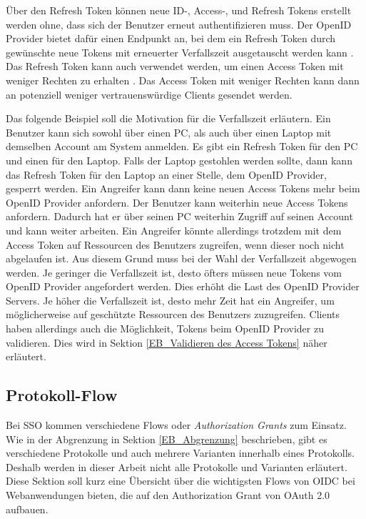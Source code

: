 Über den Refresh Token können neue ID-, Access-, und Refresh Tokens erstellt werden ohne, dass sich der Benutzer erneut authentifizieren muss. Der OpenID Provider bietet dafür einen Endpunkt an, bei dem ein Refresh Token durch gewünschte neue Tokens mit erneuerter Verfallszeit ausgetauscht werden kann \cite[Sec. 1.5]{SSEB_RFC6749}. Das Refresh Token kann auch verwendet werden, um einen Access Token mit weniger Rechten zu erhalten \cite{EB12}. Das Access Token mit weniger Rechten kann dann an potenziell weniger vertrauenswürdige Clients gesendet werden.

Das folgende Beispiel soll die Motivation für die Verfallszeit erläutern. Ein Benutzer kann sich sowohl über einen PC, als auch über einen Laptop mit demselben Account am System anmelden. Es gibt ein Refresh Token für den PC und einen für den Laptop. Falls der Laptop gestohlen werden sollte, dann kann das Refresh Token für den Laptop an einer Stelle, dem OpenID Provider, gesperrt werden. Ein Angreifer kann dann keine neuen Access Tokens mehr beim OpenID Provider anfordern. Der Benutzer kann weiterhin neue Access Tokens anfordern. Dadurch hat er über seinen PC weiterhin Zugriff auf seinen Account und kann weiter arbeiten. Ein Angreifer könnte allerdings trotzdem mit dem Access Token auf Ressourcen des Benutzers zugreifen, wenn dieser noch nicht abgelaufen ist. Aus diesem Grund muss bei der Wahl der Verfallszeit abgewogen werden. Je geringer die Verfallszeit ist, desto öfters müssen neue Tokens vom OpenID Provider angefordert werden. Dies erhöht die Last des OpenID Provider Servers. Je höher die Verfallszeit ist, desto mehr Zeit hat ein Angreifer, um möglicherweise auf geschützte Ressourcen des Benutzers zuzugreifen. Clients haben allerdings auch die Möglichkeit, Tokens beim OpenID Provider zu validieren. Dies wird in Sektion \ref{EB_Validieren des Access Tokens} näher erläutert.

\subsection{Protokoll-Flow} \label{EB_Flows}

Bei SSO kommen verschiedene Flows oder \textit{Authorization Grants} zum Einsatz. Wie in der Abgrenzung in Sektion \ref{EB_Abgrenzung} beschrieben, gibt es verschiedene Protokolle und auch mehrere Varianten innerhalb eines Protokolls. Deshalb werden in dieser Arbeit nicht alle Protokolle und Varianten erläutert. Diese Sektion soll kurz eine Übersicht über die wichtigsten Flows von OIDC bei Webanwendungen bieten, die auf den Authorization Grant von OAuth 2.0 aufbauen.

